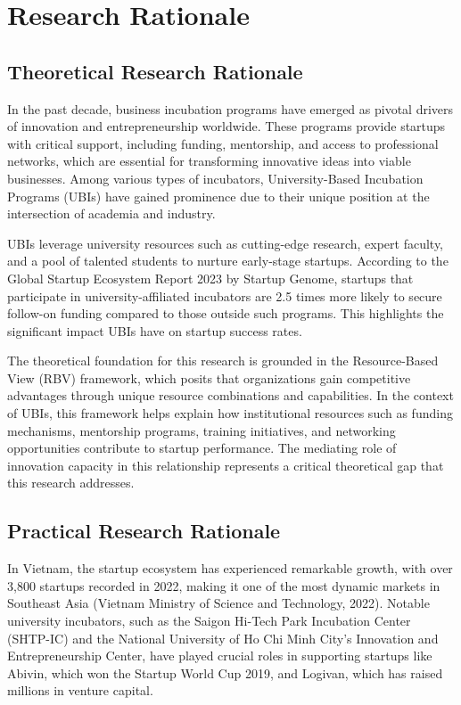 \documentclass[../Main.tex]{subfiles}
\begin{document}
	\section{Research Rationale}
	\label{section:1.1_Research_rationale}
	
	\subsection{Theoretical Research Rationale}
	\label{subsection:1.1.1_Theoretical_research_rationale}
	In the past decade, business incubation programs have emerged as pivotal drivers of innovation and entrepreneurship worldwide. These programs provide startups with critical support, including funding, mentorship, and access to professional networks, which are essential for transforming innovative ideas into viable businesses. Among various types of incubators, University-Based Incubation Programs (UBIs) have gained prominence due to their unique position at the intersection of academia and industry.

	UBIs leverage university resources such as cutting-edge research, expert faculty, and a pool of talented students to nurture early-stage startups. According to the Global Startup Ecosystem Report 2023 by Startup Genome, startups that participate in university-affiliated incubators are 2.5 times more likely to secure follow-on funding compared to those outside such programs. This highlights the significant impact UBIs have on startup success rates.

	The theoretical foundation for this research is grounded in the Resource-Based View (RBV) framework, which posits that organizations gain competitive advantages through unique resource combinations and capabilities. In the context of UBIs, this framework helps explain how institutional resources such as funding mechanisms, mentorship programs, training initiatives, and networking opportunities contribute to startup performance. The mediating role of innovation capacity in this relationship represents a critical theoretical gap that this research addresses.

	\subsection{Practical Research Rationale}
	\label{subsection:1.1.2_Practical_research_rationale}
	In Vietnam, the startup ecosystem has experienced remarkable growth, with over 3,800 startups recorded in 2022, making it one of the most dynamic markets in Southeast Asia (Vietnam Ministry of Science and Technology, 2022). Notable university incubators, such as the Saigon Hi-Tech Park Incubation Center (SHTP-IC) and the National University of Ho Chi Minh City's Innovation and Entrepreneurship Center, have played crucial roles in supporting startups like Abivin, which won the Startup World Cup 2019, and Logivan, which has raised millions in venture capital.
\end{document}

